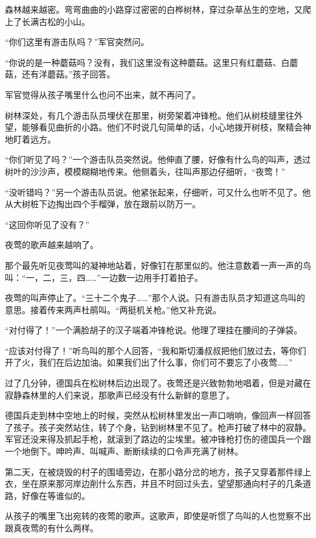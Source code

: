 \documentclass[12pt,UTF-8,openany]{ctexbook}
\begin{document}
\begin{large}
    森林越来越密。弯弯曲曲的小路穿过密密的白桦树林，穿过杂草丛生的空地，又爬上了长满古松的小山。
    
    “你们这里有游击队吗？”军官突然问。
    
    “你说的是一种蘑菇吗？没有，我们这里没有这种蘑菇。这里只有红蘑菇、白蘑菇，还有洋蘑菇。”孩子回答。
    
    军官觉得从孩子嘴里什么也问不出来，就不再问了。
    
    树林深处，有几个游击队员埋伏在那里，树旁架着冲锋枪。他们从树枝缝里往外望，能够看见曲折的小路。他们不时说几句简单的话，小心地拨开树枝，聚精会神地盯着远方。
    
    “你们听见了吗？”一个游击队员突然说。他伸直了腰，好像有什么鸟的叫声，透过树叶的沙沙声，模模糊糊地传来。他侧着头，往叫声那边仔细听，“夜莺！”
    
    “没听错吗？”另一个游击队员说。他紧张起来，仔细听，可又什么也听不见了。他从大树桩下边掏出四个手榴弹，放在跟前以防万一。
    
    “这回你听见了没有？”
    
    夜莺的歌声越来越响了。
    
    那个最先听见夜莺叫的凝神地站着，好像钉在那里似的。他注意数着一声一声的鸟叫：“一，二，三，四……”一边数一边用手打着拍子。
    
    夜莺的叫声停止了。“三十二个鬼子……”那个人说。只有游击队员才知道这鸟叫的意思。接着传来两声杜鹃叫。“两挺机关枪。”他又补充说。
    
    “对付得了！”一个满脸胡子的汉子端着冲锋枪说。他理了理挂在腰间的子弹袋。
    
    “应该对付得了！”听鸟叫的那个人回答，“我和斯切潘叔叔把他们放过去，等你们开了火，我们在后边加油。如果我们出了什么事，你们可不要忘了小夜莺……”
    
    过了几分钟，德国兵在松树林后边出现了。夜莺还是兴致勃勃地唱着，但是对藏在寂静森林里的人们来说，那歌声已经没有什么新鲜的意思了。
    
    德国兵走到林中空地上的时候，突然从松树林里发出一声口哨响，像回声一样回答了孩子。孩子突然站住，转了个身，钻到树林里不见了。枪声打破了林中的寂静。军官还没来得及抓起手枪，就滚到了路边的尘埃里。被冲锋枪打伤的德国兵一个跟一个地倒下。呻吟声、叫喊声、断断续续的口令声充满了树林。
    
    第二天，在被烧毁的村子的围墙旁边，在那小路分岔的地方，孩子又穿着那件绿上衣，坐在原来那河岸边削什么东西，并且不时回过头去，望望那通向村子的几条道路，好像在等谁似的。
    
    从孩子的嘴里飞出宛转的夜莺的歌声。这歌声，即使是听惯了鸟叫的人也觉察不出跟真夜莺的有什么两样。
    
\end{large}
\end{document}
